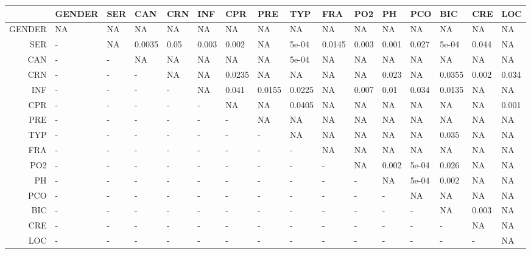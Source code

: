 \begingroup\tiny
\begin{tabular}{rlllllllllllllll}
  \hline
 & GENDER & SER & CAN & CRN & INF & CPR & PRE & TYP & FRA & PO2 & PH & PCO & BIC & CRE & LOC \\ 
  \hline
GENDER & NA & NA & NA & NA & NA & NA & NA & NA & NA & NA & NA & NA & NA & NA & NA \\ 
  SER & - & NA & 0.0035 & 0.05 & 0.003 & 0.002 & NA & 5e-04 & 0.0145 & 0.003 & 0.001 & 0.027 & 5e-04 & 0.044 & NA \\ 
  CAN & - & - & NA & NA & NA & NA & NA & 5e-04 & NA & NA & NA & NA & NA & NA & NA \\ 
  CRN & - & - & - & NA & NA & 0.0235 & NA & NA & NA & NA & 0.023 & NA & 0.0355 & 0.002 & 0.034 \\ 
  INF & - & - & - & - & NA & 0.041 & 0.0155 & 0.0225 & NA & 0.007 & 0.01 & 0.034 & 0.0135 & NA & NA \\ 
  CPR & - & - & - & - & - & NA & NA & 0.0405 & NA & NA & NA & NA & NA & NA & 0.001 \\ 
  PRE & - & - & - & - & - & - & NA & NA & NA & NA & NA & NA & NA & NA & NA \\ 
  TYP & - & - & - & - & - & - & - & NA & NA & NA & NA & NA & 0.035 & NA & NA \\ 
  FRA & - & - & - & - & - & - & - & - & NA & NA & NA & NA & NA & NA & NA \\ 
  PO2 & - & - & - & - & - & - & - & - & - & NA & 0.002 & 5e-04 & 0.026 & NA & NA \\ 
  PH & - & - & - & - & - & - & - & - & - & - & NA & 5e-04 & 0.002 & NA & NA \\ 
  PCO & - & - & - & - & - & - & - & - & - & - & - & NA & NA & NA & NA \\ 
  BIC & - & - & - & - & - & - & - & - & - & - & - & - & NA & 0.003 & NA \\ 
  CRE & - & - & - & - & - & - & - & - & - & - & - & - & - & NA & NA \\ 
  LOC & - & - & - & - & - & - & - & - & - & - & - & - & - & - & NA \\ 
   \hline
\end{tabular}
\endgroup
